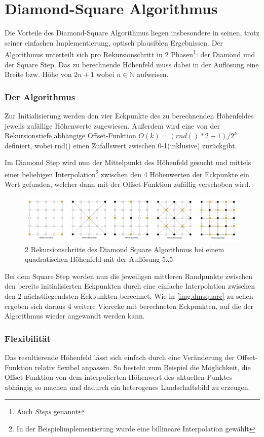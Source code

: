 \chapter{Diamond-Square Algorithmus}
Die Vorteile des Diamond-Square Algorithmus liegen insbesondere in seinen, trotz seiner einfachen Implementierung, optisch plausiblen Ergebnissen. 
Der Algorithmus unterteilt sich pro Rekursionschritt in 2 Phasen\footnote{Auch \emph{Steps} genannt}: der Diamond und der Square Step. Das zu berechnende Höhenfeld muss dabei in der Auflösung eine Breite bzw. Höhe von $2n+1$ wobei $ n\in\mathbb{N}$ aufweisen.

\subsection{Der Algorithmus}
Zur Initialisierung werden den vier Eckpunkte des zu berechnenden Höhenfeldes jeweils zufällige Höhenwerte zugewiesen. Außerdem wird eine von der Rekursionstiefe abhängige Offset-Funktion $O(k)=(rnd()*2-1)/2^k$ definiert, wobei rnd() einen Zufallswert zwischen 0-1(inklusive) zurückgibt.

Im Diamond Step wird nun der Mittelpunkt des Höhenfeld gesucht und mittels einer beliebigen Interpolation\footnote{In der Beispielimplementierung wurde eine billineare Interpolation gewählt} zwischen den 4 Höhenwerten der Eckpunkte ein Wert gefunden, welcher dann mit der Offset-Funktion zufällig verschoben wird.
\begin{figure}
	\centering
	\includegraphics[width=\textwidth]{images/Diamond_Square.png}
	\caption{2 Rekursionschritte des Diamond Square Algorithmus bei einem quadratischen Höhenfeld mit der Auflösung 5x5}\label{img.dmsquare}
\end{figure}
Bei dem Square Step werden nun die jeweiligen mittleren Randpunkte zwischen den bereits initialisierten Eckpunkten durch eine einfache Interpolation zwischen den 2 nächstliegendsten Eckpunkten berechnet.
Wie in \autoref{img.dmsquare} zu sehen ergeben sich daraus 4 weitere Vierecke mit berechneten Eckpunkten, auf die der Algorithmus wieder angewandt werden kann.

\subsection{Flexibilität}
Das resultierende Höhenfeld lässt sich einfach durch eine Veränderung der Offset-Funktion relativ flexibel anpassen. So besteht zum Beispiel die Möglichkeit, die Offset-Funktion von dem interpolierten Höhenwert des aktuellen Punktes abhängig so machen und dadurch ein heterogenes Landschaftsbild zu erzeugen.

